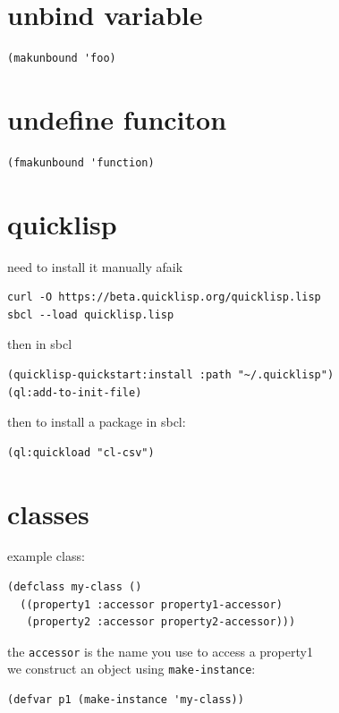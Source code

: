 \documentclass[a4paper,12pt]{article}
\begin{document}
\section{unbind variable}
\label{sec:orge636551}
\lstset{language=Lisp,label= ,caption= ,captionpos=b,numbers=none}
\begin{lstlisting}
(makunbound 'foo)
\end{lstlisting}
\section{undefine funciton}
\label{sec:org217abd2}
\lstset{language=Lisp,label= ,caption= ,captionpos=b,numbers=none}
\begin{lstlisting}
(fmakunbound 'function)
\end{lstlisting}
\section{quicklisp}
\label{sec:org4d7902c}
need to install it manually afaik\\
\lstset{language=bash,label= ,caption= ,captionpos=b,numbers=none}
\begin{lstlisting}
curl -O https://beta.quicklisp.org/quicklisp.lisp
sbcl --load quicklisp.lisp
\end{lstlisting}
then in sbcl\\
\lstset{language=Lisp,label= ,caption= ,captionpos=b,numbers=none}
\begin{lstlisting}
(quicklisp-quickstart:install :path "~/.quicklisp")
(ql:add-to-init-file)
\end{lstlisting}
then to install a package in sbcl:\\
\lstset{language=Lisp,label= ,caption= ,captionpos=b,numbers=none}
\begin{lstlisting}
(ql:quickload "cl-csv")
\end{lstlisting}
\section{classes}
\label{sec:orgef1aa29}
example class:\\
\lstset{language=Lisp,label= ,caption= ,captionpos=b,numbers=none}
\begin{lstlisting}
(defclass my-class ()
  ((property1 :accessor property1-accessor)
   (property2 :accessor property2-accessor)))
\end{lstlisting}

the \texttt{accessor} is the name you use to access a property1\\
we construct an object using \texttt{make-instance}:\\
\lstset{language=Lisp,label= ,caption= ,captionpos=b,numbers=none}
\begin{lstlisting}
(defvar p1 (make-instance 'my-class))
\end{lstlisting}
\end{document}
